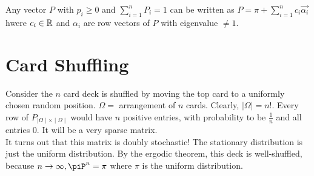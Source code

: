 \documentclass[a4paper]{article}
\begin{document}
\begin{corollary}
  Any vector $P$ with  $p_i \geq 0$ and  $\sum_{i=1}^{n} P_i = 1$ can be written as $P= \pi + \sum_{i=1}^{n} c_i \vec{\alpha_i}$ hwere $c_i \in \mathbb{R}$ and $\alpha_i$ are row vectors of  $P$ with eigenvalue  $\neq 1$.
\end{corollary}

\section{Card Shuffling}
Consider the $n$ card deck is shuffled by moving the top card to a uniformly chosen random position.  $\Omega =$ arrangement of  $n$ cards. Clearly,  $\mid \Omega \mid  = n!$. Every row of $P_{\mid \Omega \mid  \times \mid \Omega \mid}$ would have $n$ positive entries, with probability to be $\frac{1}{n}$ and all entries $0$. It will be a very sparse matrix. \\


It turns out that this matrix is doubly stochastic! The stationary distribution is just the uniform distribution. By the ergodic theorem, this deck is well-shuffled, because  $n \to \infty, \piP^{n} = \pi$ where $\pi$ is the uniform distribution. 
\end{document}
